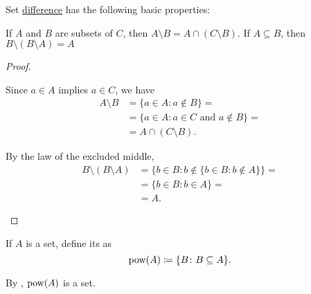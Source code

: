 \begin{proposition}\label{thm:set_difference_properties}
  Set \hyperref[def:set_difference]{difference} has the following basic properties:
  \begin{propenum}
     If \( A \) and \( B \) are subsets of \( C \), then \( A \setminus B = A \cap (C \setminus B) \).
     If \( A \subseteq B \), then \( B \setminus (B \setminus A) = A \)
  \end{propenum}
\end{proposition}
\begin{proof}\mbox{}
  \begin{description}
     Since \( a \in A \) implies \( a \in C \), we have
    \begin{align*}
      A \setminus B
      &=
      \{ a \in A \colon a \not\in B \}
      = \\ &=
      \{ a \in A \colon a \in C \text{ and } a \not\in B \}
      = \\ &=
      A \cap (C \setminus B).
    \end{align*}

     By the law of the excluded middle,
    \begin{align*}
      B \setminus (B \setminus A)
      &=
      \{ b \in B \colon b \not\in \{ b \in B \colon b \not\in A \} \}
      = \\ &=
      \{ b \in B \colon b \in A \}
      = \\ &=
      A.
    \end{align*}
  \end{description}
\end{proof}

\begin{definition}\label{def:power_set}\cite[19]{Enderton1977}
  If \( A \) is a set, define its  as
  \begin{equation*}
    \operatorname{pow}(A) \coloneqq \{ B \colon B \subseteq A \}.
  \end{equation*}

  By , \( \operatorname{pow}(A) \) is a set.
\end{definition}

